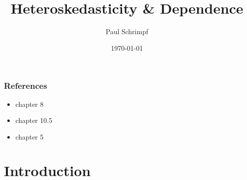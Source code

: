 %

\title{Heteroskedasticity \& Dependence} 
\author{Paul Schrimpf} 
\date{\today}

\graphicspath{{figures/}}



\frame{\titlepage}

\begin{frame}
  \tableofcontents  
\end{frame}

\begin{frame}
  \frametitle{References}
  \begin{itemize}
  \item \cite{w2013} chapter 8
  \item \cite{sw2009} chapter 10.5
  \item \cite{ap2014} chapter 5
  \end{itemize}
\end{frame}


\section{Introduction}

